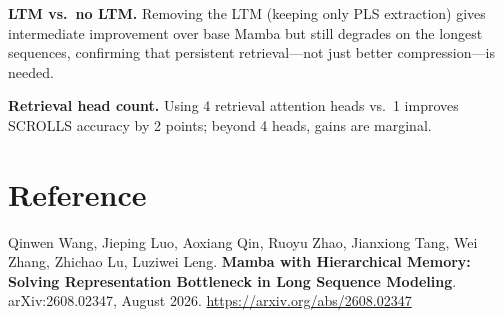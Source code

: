 \documentclass[10pt,twocolumn]{article}
\begin{document}
\textbf{LTM vs.\ no LTM.} Removing the LTM (keeping only PLS extraction) gives
intermediate improvement over base Mamba but still degrades on the longest sequences,
confirming that persistent retrieval---not just better compression---is needed.

\textbf{Retrieval head count.} Using 4 retrieval attention heads vs.\ 1 improves
SCROLLS accuracy by 2 points; beyond 4 heads, gains are marginal.

\section*{Reference}

Qinwen Wang, Jieping Luo, Aoxiang Qin, Ruoyu Zhao, Jianxiong Tang, Wei Zhang,
Zhichao Lu, Luziwei Leng.
\textbf{Mamba with Hierarchical Memory: Solving Representation Bottleneck in Long
Sequence Modeling}. arXiv:2608.02347, August 2026.
\url{https://arxiv.org/abs/2608.02347}
\end{document}
